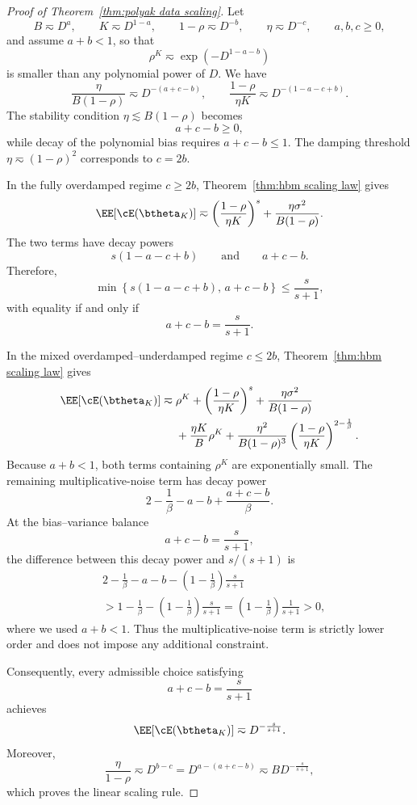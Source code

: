 \begin{proof}[Proof of Theorem~\ref{thm:polyak data scaling}]
Let
\[
B\eqsim D^a,
\qquad
K\eqsim D^{1-a},
\qquad
1-\rho\eqsim D^{-b},
\qquad
\eta\eqsim D^{-c},
\qquad
a,b,c\geq0,
\]
and assume \(a+b<1\), so that
\[
\rho^K
\eqsim
\exp\!\left(-D^{1-a-b}\right)
\]
is smaller than any polynomial power of \(D\). We have
\[
\frac{\eta}{B(1-\rho)}
\eqsim
D^{-(a+c-b)},
\qquad
\frac{1-\rho}{\eta K}
\eqsim
D^{-(1-a-c+b)}.
\]
The stability condition \(\eta\lesssim B(1-\rho)\) becomes
\[
a+c-b\geq0,
\]
while decay of the polynomial bias requires \(a+c-b\leq1\). The damping
threshold \(\eta\eqsim(1-\rho)^2\) corresponds to \(c=2b\).

In the fully overdamped regime \(c\geq2b\), Theorem~\ref{thm:hbm scaling law}
gives
\[
\EE[\cE(\btheta_K)]
\eqsim
\left(\frac{1-\rho}{\eta K}\right)^s
+
\frac{\eta\sigma^2}{B(1-\rho)}.
\]
The two terms have decay powers
\[
s(1-a-c+b)
\qquad\text{and}\qquad
a+c-b.
\]
Therefore,
\[
\min\left\{
s(1-a-c+b),\,a+c-b
\right\}
\leq
\frac{s}{s+1},
\]
with equality if and only if
\[
a+c-b=\frac{s}{s+1}.
\]

In the mixed overdamped--underdamped regime \(c\leq2b\),
Theorem~\ref{thm:hbm scaling law} gives
\[
\begin{aligned}
\EE[\cE(\btheta_K)]
\eqsim{}&
\rho^K
+
\left(\frac{1-\rho}{\eta K}\right)^s
+
\frac{\eta\sigma^2}{B(1-\rho)}\\
&+
\frac{\eta K}{B}\rho^K
+
\frac{\eta^2}{B(1-\rho)^3}
\left(\frac{1-\rho}{\eta K}\right)^{2-\frac1\beta}.
\end{aligned}
\]
Because \(a+b<1\), both terms containing \(\rho^K\) are exponentially small.
The remaining multiplicative-noise term has decay power
\[
2-\frac1\beta-a-b+\frac{a+c-b}{\beta}.
\]
At the bias--variance balance
\[
a+c-b=\frac{s}{s+1},
\]
the difference between this decay power and \(s/(s+1)\) is
\[
\begin{aligned}
&2-\frac1\beta-a-b
-\left(1-\frac1\beta\right)\frac{s}{s+1}\\
&>
1-\frac1\beta
-\left(1-\frac1\beta\right)\frac{s}{s+1}
=
\left(1-\frac1\beta\right)\frac{1}{s+1}
>0,
\end{aligned}
\]
where we used \(a+b<1\). Thus the multiplicative-noise term is strictly
lower order and does not impose any additional constraint.

Consequently, every admissible choice satisfying
\[
a+c-b=\frac{s}{s+1}
\]
achieves
\[
\EE[\cE(\btheta_K)]
\eqsim
D^{-\frac{s}{s+1}}.
\]
Moreover,
\[
\frac{\eta}{1-\rho}
\eqsim
D^{b-c}
=
D^{a-(a+c-b)}
\eqsim
B D^{-\frac{s}{s+1}},
\]
which proves the linear scaling rule.


\end{proof}
